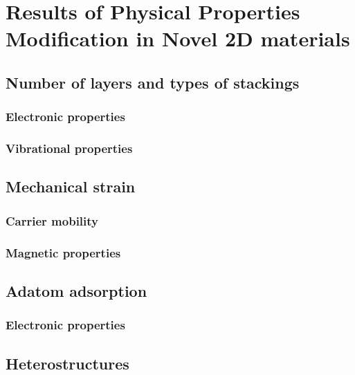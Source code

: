 
\chapter{Results of Physical Properties Modification in Novel 2D materials \label{chap:5}}

\ifpdf
    \graphicspath{{Chapter5/Figs/Raster/}{Chapter5/Figs/PDF/}{Chapter5/Figs/}}
\else
    \graphicspath{{Chapter5/Figs/Vector/}{Chapter5/Figs/}}
\fi


\section{Number of layers and types of stackings}
\subsection{Electronic properties}
\subsection{Vibrational properties}

\section{Mechanical strain}
\subsection{Carrier mobility}
\subsection{Magnetic properties}

\section{Adatom adsorption}
\subsection{Electronic properties}

\section{Heterostructures}
